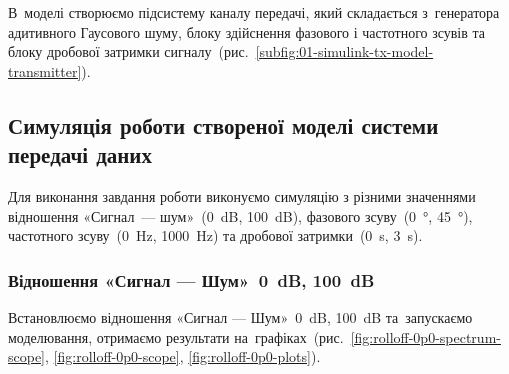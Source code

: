 \documentclass[
	a4paper,
	oneside,
	BCOR = 10mm,
	DIV = 12,
	12pt,
	headings = normal,
]{scrartcl}
\begin{document}
			В~моделі створюємо підсистему каналу передачі, який складається з~генератора адитивного Гаусового шуму, блоку здійснення фазового і частотного зсувів та блоку дробової затримки сигналу~(рис.~\ref{subfig:01-simulink-tx-model-transmitter}).

		\subsection{Симуляція роботи створеної моделі системи передачі даних}
			Для виконання завдання роботи виконуємо симуляцію з різними значеннями відношення «Сигнал~— шум»~(\SI{0}{\deci\bel}, \SI{100}{\deci\bel}), фазового зсуву~(\SI{0}{\degree}, \SI{45}{\degree}), частотного зсуву~(\SI{0}{\hertz}, \SI{1000}{\hertz}) та дробової затримки~(\SI{0}{\second}, \SI{3}{\second}).

			\clearpage
			\subsubsection{Відношення «Сигнал — Шум»~\SI{0}{\deci\bel}, \SI{100}{\deci\bel}}
				Встановлюємо відношення «Сигнал — Шум»~\SI{0}{\deci\bel}, \SI{100}{\deci\bel} та~запускаємо моделювання, отримаємо результати на~графіках~(рис.~\ref{fig:rolloff-0p0-spectrum-scope}, \ref{fig:rolloff-0p0-scope}, \ref{fig:rolloff-0p0-plots}).
\end{document}
